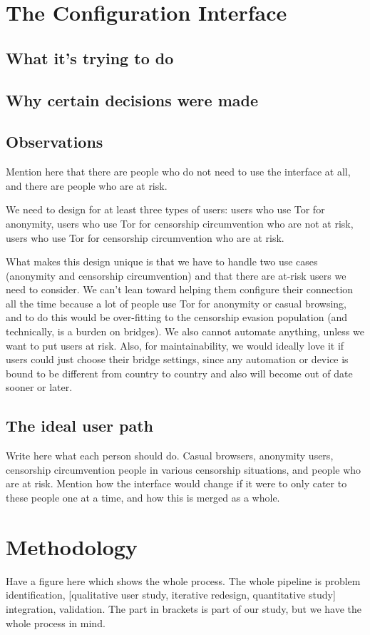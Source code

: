\documentclass{template}
\begin{document}
\section{The Configuration Interface}

\subsection{What it's trying to do}
\subsection{Why certain decisions were made}
\subsection{Observations} 
Mention here that there are people who do not need to use the interface at all, and there are people who are at risk. 


We need to design for at least three types of users: users who use Tor for anonymity, users who use Tor for censorship circumvention who are not at risk, users who use Tor for censorship circumvention who are at risk. 

What makes this design unique is that we have to handle two use cases (anonymity and censorship circumvention) and that there are at-risk users we need to consider. We can't lean toward helping them configure their connection all the time because a lot of people use Tor for anonymity or casual browsing, and to do this would be over-fitting to the censorship evasion population (and technically, is a burden on bridges). We also cannot automate anything, unless we want to put users at risk. Also, for maintainability, we would ideally love it if users could just choose their bridge settings, since any automation or device is bound to be different from country to country and also will become out of date sooner or later. 

\subsection{The ideal user path} 
Write here what each person should do. Casual browsers, anonymity users, censorship circumvention people in various censorship situations, and people who are at risk. Mention how the interface would change if it were to only cater to these people one at a time, and how this is merged as a whole. 

\section{Methodology}
Have a figure here which shows the whole process. The whole pipeline is problem identification, [qualitative user study, iterative redesign, quantitative study] integration, validation. The part in brackets is part of our study, but we have the whole process in mind. 
\end{document}
